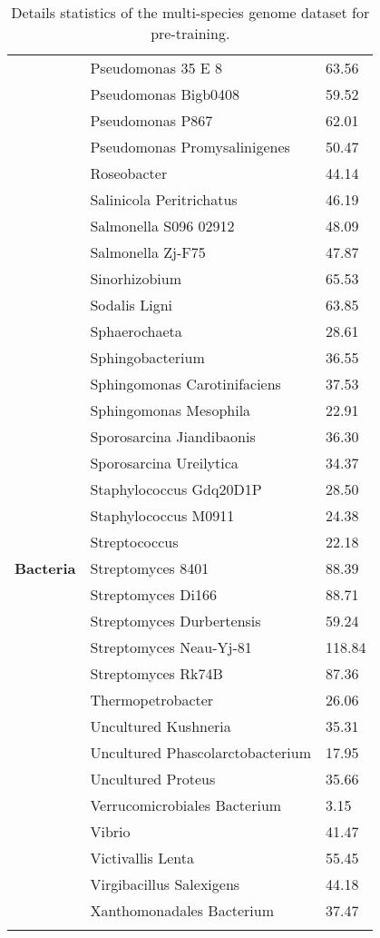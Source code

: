 \documentclass{article}
\begin{document}
\begin{longtable}{lll}
& Pseudomonas 35 E 8 & 63.56 \\
& Pseudomonas Bigb0408 & 59.52 \\
& Pseudomonas P867 & 62.01 \\
& Pseudomonas Promysalinigenes & 50.47 \\
& Roseobacter & 44.14 \\
& Salinicola Peritrichatus & 46.19 \\
& Salmonella S096 02912 & 48.09 \\
& Salmonella Zj-F75 & 47.87 \\
& Sinorhizobium & 65.53 \\
& Sodalis Ligni & 63.85 \\
& Sphaerochaeta & 28.61 \\
& Sphingobacterium & 36.55 \\
& Sphingomonas Carotinifaciens & 37.53 \\
& Sphingomonas Mesophila & 22.91 \\
& Sporosarcina Jiandibaonis & 36.30 \\
& Sporosarcina Ureilytica & 34.37 \\
& Staphylococcus Gdq20D1P & 28.50 \\
& Staphylococcus M0911 & 24.38 \\
& Streptococcus & 22.18 \\
\textbf{Bacteria} & Streptomyces 8401 & 88.39 \\
& Streptomyces Di166 & 88.71 \\
& Streptomyces Durbertensis & 59.24 \\
& Streptomyces Neau-Yj-81 & 118.84 \\
& Streptomyces Rk74B & 87.36 \\
& Thermopetrobacter & 26.06 \\
& Uncultured Kushneria & 35.31 \\
& Uncultured Phascolarctobacterium & 17.95 \\
& Uncultured Proteus & 35.66 \\
& Verrucomicrobiales Bacterium & 3.15 \\
& Vibrio & 41.47 \\
& Victivallis Lenta & 55.45 \\
& Virgibacillus Salexigens & 44.18 \\
& Xanthomonadales Bacterium & 37.47 \\

\bottomrule

 \caption{Details statistics of the multi-species genome dataset for pre-training.}\label{tb:multi_species_details} 
\end{longtable}
\end{document}

